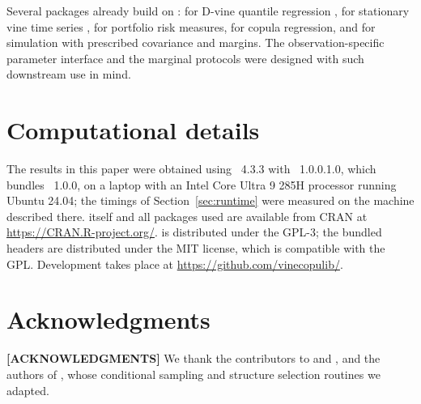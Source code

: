 \documentclass[article]{jss}
\newcommand{\pkgversion}{1.0.0.1.0}
\newcommand{\vcldversion}{1.0.0}
\begin{document}
Several  packages already build on :
 \citep{vinereg} for D-vine quantile regression
\citep{kraus2017},  \citep{svines} for stationary vine time series
\citep{nagler2022},  \citep{portvine} for portfolio risk measures,
 \citep{copulareg} for copula regression, and 
\citep{covsim} for simulation with prescribed covariance and margins.  The
observation-specific parameter interface and the marginal protocols were
designed with such downstream use in mind.

\section*{Computational details}

The results in this paper were obtained using ~4.3.3
\citep{R} with ~\pkgversion, which bundles
~\vcldversion, on a laptop with an Intel Core Ultra 9 285H
processor running Ubuntu 24.04; the timings of Section~\ref{sec:runtime} were
measured on the machine described there.   itself and all packages used are
available from CRAN at \url{https://CRAN.R-project.org/}.
 is distributed under the GPL-3; the bundled
 headers are distributed under the MIT license, which is
compatible with the GPL.  Development takes place at
\url{https://github.com/vinecopulib/}.

\section*{Acknowledgments}

\textbf{[ACKNOWLEDGMENTS]}  We thank the contributors to  and
, and the authors of  \citep{claassen2024},
whose conditional sampling and structure selection routines we adapted.


\end{document}
